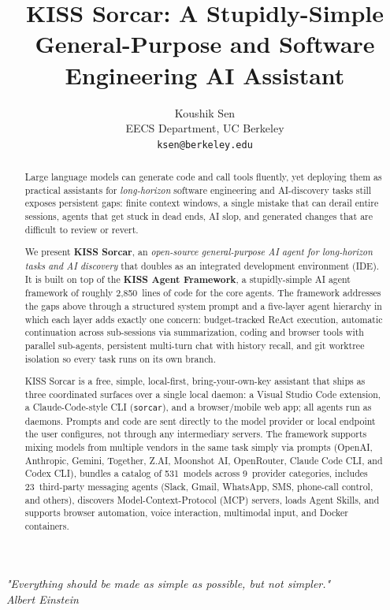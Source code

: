 \documentclass{article}
\title{KISS Sorcar: A Stupidly-Simple General-Purpose and Software Engineering AI Assistant}
\author{%
Koushik Sen \\ EECS Department, UC Berkeley\\ \texttt{ksen@berkeley.edu} \\ }
\begin{document}
\maketitle

\begin{center}
\textit{"Everything should be made as simple as possible, but not simpler."}\\
\textit{Albert Einstein}
\end{center}

\begin{abstract}
Large language models can generate code and call tools fluently, yet deploying them as practical assistants for \emph{long-horizon} software engineering and AI-discovery tasks still exposes persistent gaps: finite context windows, a single mistake that can derail entire sessions, agents that get stuck in dead ends, AI slop, and generated changes that are difficult to review or revert.

We present \textbf{KISS Sorcar}, an \emph{open-source general-purpose AI agent for long-horizon tasks and AI discovery} that doubles as an integrated development environment (IDE).  It is built on top of the \textbf{KISS Agent Framework}, a stupidly-simple AI agent framework of roughly 2,850~lines of code for the core agents.  The framework addresses the gaps above through a structured system prompt and a five-layer agent hierarchy in which each layer adds exactly one concern: budget-tracked ReAct execution, automatic continuation across sub-sessions via summarization, coding and browser tools with parallel sub-agents, persistent multi-turn chat with history recall, and git worktree isolation so every task runs on its own branch.

KISS Sorcar is a free, simple, local-first, bring-your-own-key assistant that ships as three coordinated surfaces over a single local daemon: a Visual Studio Code extension, a Claude-Code-style CLI (\texttt{sorcar}), and a browser/mobile web app; all agents run as daemons.  Prompts and code are sent directly to the model provider or local endpoint the user configures, not through any intermediary servers.  The framework supports mixing models from multiple vendors in the same task simply via prompts (OpenAI, Anthropic, Gemini, Together, Z.AI, Moonshot AI, OpenRouter, Claude Code CLI, and Codex CLI), bundles a catalog of 531~models across 9~provider categories, includes 23~third-party messaging agents (Slack, Gmail, WhatsApp, SMS, phone-call control, and others), discovers Model-Context-Protocol (MCP) servers, loads Agent Skills, and supports browser automation, voice interaction, multimodal input, and Docker containers.


\end{abstract}
\end{document}
